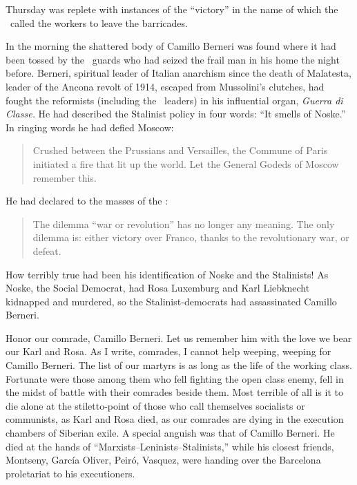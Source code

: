 \dinkus

Thursday was replete with instances of the ``victory'' in the name of which the \POUM\ called the workers to leave the barricades.

In the morning the shattered body of Camillo Berneri was found where it had been tossed by the \PSUC\ guards who had seized the frail man in his home the night before. Berneri, spiritual leader of Italian anarchism since the death of Malatesta, leader of the Ancona revolt of 1914, escaped from Mussolini’s clutches, had fought the reformists (including the \CNT\ leaders) in his influential organ, \emph{Guerra di Classe.} He had described the Stalinist policy in four words: ``It smells of Noske.'' In ringing words he had defied Moscow:

\begin{quotation}
  Crushed between the Prussians and Versailles, the Commune of Paris initiated a fire that lit up the world. Let the General Godeds of Moscow remember this.  
\end{quotation}

He had declared to the masses of the \CNT:

\begin{quotation}
  The dilemma “war or revolution” has no longer any meaning. The only dilemma is: either victory over Franco, thanks to the revolutionary war, or defeat.
\end{quotation}

How terribly true had been his identification of Noske and the Stalinists! As Noske, the Social Democrat, had Rosa Luxemburg and Karl Liebknecht kidnapped and murdered, so the Stalinist-democrats had assassinated Camillo Berneri.
 
Honor our comrade, Camillo Berneri. Let us remember him with the love we bear our Karl and Rosa. As I write, comrades, I cannot help weeping, weeping for Camillo Berneri. The list of our martyrs is as long as the life of the working class. Fortunate were those among them who fell fighting the open class enemy, fell in the midst of battle with their comrades beside them. Most terrible of all is it to die alone at the stiletto-point of those who call themselves socialists or communists, as Karl and Rosa died, as our comrades are dying in the execution chambers of Siberian exile. A special anguish was that of Camillo Berneri. He died at the hands of \kp``Marxists--Leninists--Stalinists,'' while his closest friends, Montseny, Garc\'ia Oliver, Peir\'o, Vasquez, were handing over the Barcelona proletariat to his executioners.
 
